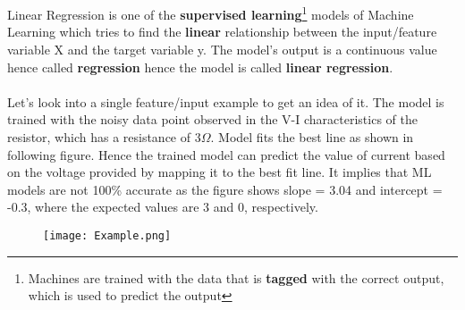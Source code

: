 \documentclass{homework}
\begin{document}
\section{}
Linear Regression is one of the \textbf{supervised learning}\footnote{Machines are trained with the data that is \textbf{tagged} with the correct output, which is used to predict the output} models of Machine Learning which tries to find the \textbf{linear} relationship between the input/feature variable X and the target variable y. 
The model's output is a continuous value hence called \textbf{regression} hence the model is called \textbf{linear regression}.\\
 \\
Let's look into a single feature/input example to get an idea of it.
The model is trained with the noisy data point observed in the V-I characteristics of the resistor, which has a resistance of 3$\Omega$. Model fits the best line as shown in following figure. Hence the trained model can predict the value of current based on the voltage provided by mapping it to the best fit line. It implies that ML models are not 100\% accurate as the figure shows slope = 3.04 and intercept = -0.3, where the expected values are 3 and 0, respectively.
\begin{figure}[h]
\centering
\texttt{[image: Example.png]}
\caption{}
\end{figure}
\end{document}
